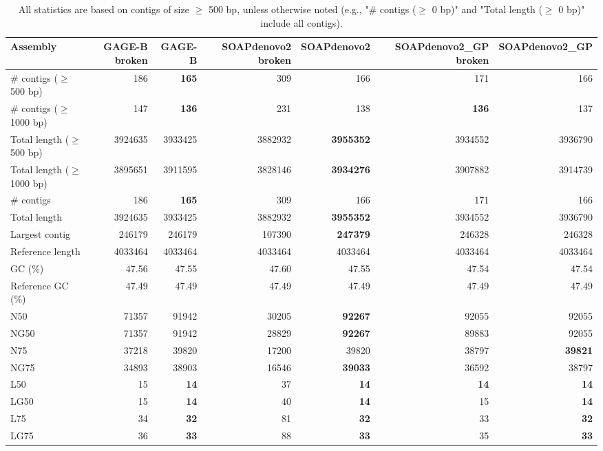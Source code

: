 \documentclass[12pt,a4paper]{article}
\begin{document}
\begin{table}[ht]
\begin{center}
\caption{All statistics are based on contigs of size $\geq$ 500 bp, unless otherwise noted (e.g., "\# contigs ($\geq$ 0 bp)" and "Total length ($\geq$ 0 bp)" include all contigs).}
\begin{tabular}{|l*{6}{|r}|}
\hline
Assembly & GAGE-B broken & GAGE-B & SOAPdenovo2 broken & SOAPdenovo2 & SOAPdenovo2\_GP broken & SOAPdenovo2\_GP \\ \hline
\# contigs ($\geq$ 500 bp) & 186 & {\bf 165} & 309 & 166 & 171 & 166 \\ \hline
\# contigs ($\geq$ 1000 bp) & 147 & {\bf 136} & 231 & 138 & {\bf 136} & 137 \\ \hline
Total length ($\geq$ 500 bp) & 3924635 & 3933425 & 3882932 & {\bf 3955352} & 3934552 & 3936790 \\ \hline
Total length ($\geq$ 1000 bp) & 3895651 & 3911595 & 3828146 & {\bf 3934276} & 3907882 & 3914739 \\ \hline
\# contigs & 186 & {\bf 165} & 309 & 166 & 171 & 166 \\ \hline
Total length & 3924635 & 3933425 & 3882932 & {\bf 3955352} & 3934552 & 3936790 \\ \hline
Largest contig & 246179 & 246179 & 107390 & {\bf 247379} & 246328 & 246328 \\ \hline
Reference length & 4033464 & 4033464 & 4033464 & 4033464 & 4033464 & 4033464 \\ \hline
GC (\%) & 47.56 & 47.55 & 47.60 & 47.55 & 47.54 & 47.54 \\ \hline
Reference GC (\%) & 47.49 & 47.49 & 47.49 & 47.49 & 47.49 & 47.49 \\ \hline
N50 & 71357 & 91942 & 30205 & {\bf 92267} & 92055 & 92055 \\ \hline
NG50 & 71357 & 91942 & 28829 & {\bf 92267} & 89883 & 92055 \\ \hline
N75 & 37218 & 39820 & 17200 & 39820 & 38797 & {\bf 39821} \\ \hline
NG75 & 34893 & 38903 & 16546 & {\bf 39033} & 36592 & 38797 \\ \hline
L50 & 15 & {\bf 14} & 37 & {\bf 14} & {\bf 14} & {\bf 14} \\ \hline
LG50 & 15 & {\bf 14} & 40 & {\bf 14} & 15 & {\bf 14} \\ \hline
L75 & 34 & {\bf 32} & 81 & {\bf 32} & 33 & {\bf 32} \\ \hline
LG75 & 36 & {\bf 33} & 88 & {\bf 33} & 35 & {\bf 33} \\ \hline

\end{tabular}
\end{center}
\end{table}
\end{document}
